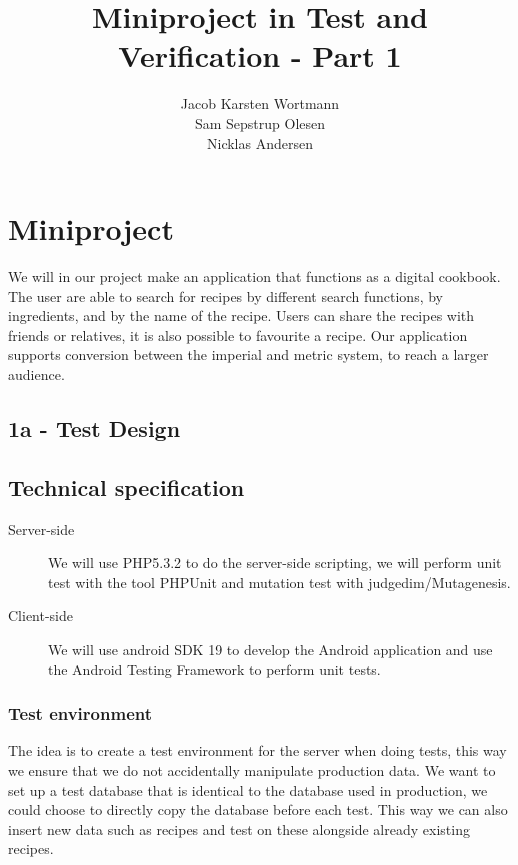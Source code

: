 \documentclass[a4paper,12pt]{memoir}
\title{Miniproject in Test and Verification - Part 1}
\author{Jacob Karsten Wortmann\\Sam Sepstrup Olesen\\Nicklas Andersen}
\begin{document}
\maketitle
\chapter*{Miniproject}
We will in our project make an application that functions as a digital cookbook. The user are able to search for recipes by different search functions, by ingredients, and by the name of the recipe. Users can share the recipes with friends or relatives, it is also possible to favourite a recipe. Our application supports conversion between the imperial and metric system, to reach a larger audience.

\section*{1a - Test Design}
\section*{Technical specification}
\begin{description}
    \item[Server-side]
        We will use PHP5.3.2 to do the server-side scripting,
        we will perform unit test with the tool PHPUnit and mutation test with judgedim/Mutagenesis.
    \item[Client-side]
        We will use android SDK 19 to develop the Android application and use the Android Testing Framework to perform unit tests.
\end{description}

\subsection{Test environment}
The idea is to create a test environment for the server when doing tests, this way we ensure that we do not accidentally manipulate production data. We want to set up a test database that is identical to the database used in production, we could choose to directly copy the database before each test. This way we can also insert new data such as recipes and test on these alongside already existing recipes.
\end{document}

